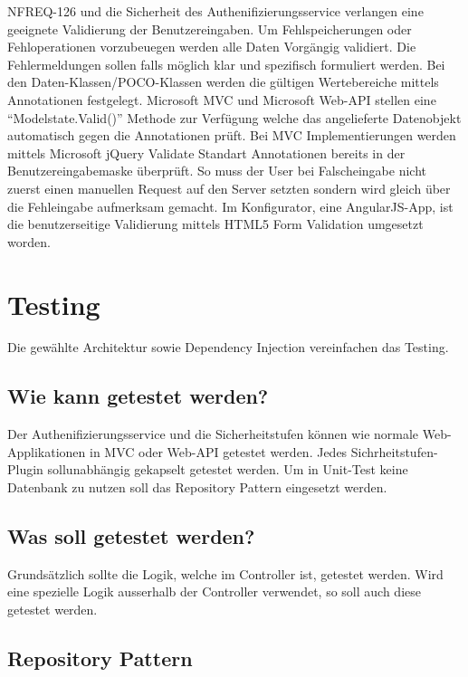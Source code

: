 NFREQ-126 und die Sicherheit des Authenifizierungsservice verlangen eine
geeignete Validierung der Benutzereingaben. Um Fehlspeicherungen oder
Fehloperationen vorzubeuegen werden alle Daten Vorgängig validiert. Die
Fehlermeldungen sollen falls möglich klar und spezifisch formuliert
werden. Bei den Daten-Klassen/POCO-Klassen werden die gültigen
Wertebereiche mittels Annotationen festgelegt. Microsoft MVC und
Microsoft Web-API stellen eine ``Modelstate.Valid()'' Methode zur
Verfügung welche das angelieferte Datenobjekt automatisch gegen die
Annotationen prüft. Bei MVC Implementierungen werden mittels Microsoft
jQuery Validate Standart Annotationen bereits in der
Benutzereingabemaske überprüft. So muss der User bei Falscheingabe nicht
zuerst einen manuellen Request auf den Server setzten sondern wird
gleich über die Fehleingabe aufmerksam gemacht. Im Konfigurator, eine
AngularJS-App, ist die benutzerseitige Validierung mittels HTML5 Form
Validation umgesetzt worden.

\section{Testing}\label{testing}

Die gewählte Architektur sowie Dependency Injection vereinfachen das
Testing.

\subsection{Wie kann getestet werden?}\label{wie-kann-getestet-werden}

Der Authenifizierungsservice und die Sicherheitstufen können wie normale
Web-Applikationen in MVC oder Web-API getestet werden. Jedes
Sichrheitstufen-Plugin sollunabhängig gekapselt getestet werden. Um in
Unit-Test keine Datenbank zu nutzen soll das Repository Pattern
eingesetzt werden.

\subsection{Was soll getestet werden?}\label{was-soll-getestet-werden}

Grundsätzlich sollte die Logik, welche im Controller ist, getestet
werden. Wird eine spezielle Logik ausserhalb der Controller verwendet,
so soll auch diese getestet werden.

\subsection{Repository Pattern}\label{repository-pattern}


